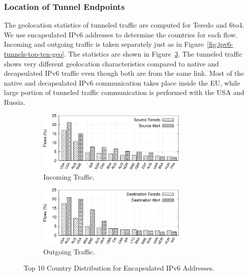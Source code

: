 \subsubsection{Location of Tunnel Endpoints}
The geolocation statistics of tunneled traffic are computed for Teredo and 6to4. We use encapsulated IPv6 addresses to determine the countries for each flow. Incoming and outgoing traffic is taken separately just as in Figure~\ref{fig:ipv6-tunnels-top-ten-geo}. The statistics are shown in Figure~\ref{fig:ipv6-tunnels-geo-tun-both}.
The tunneled traffic shows very different geolocation characteristics compared to native and decapsulated IPv6 traffic even though both are from the same link. 
Most of the native and decapsulated IPv6 communication takes place inside the EU, while large portion of tunneled traffic communication is performed with the USA and Russia. 

\begin{figure}[!tb]
    \begin{subfigure}{\textwidth}
        \centering
        \includegraphics[width=0.8\textwidth]{figures/paper-tunnels/ctry_distribution/ctry_distribution-tun-in}
        \caption{Incoming Traffic.}
        \label{fig:ipv6-tunnels-geo-tun-in}
    \end{subfigure}
    \begin{subfigure}{\textwidth}
        \centering
        \includegraphics[width=0.8\textwidth]{figures/paper-tunnels/ctry_distribution/ctry_distribution-tun-out}
        \caption{Outgoing Traffic.}
        \label{fig:ipv6-tunnels-eo-tun-out}
    \end{subfigure}
    \caption{Top 10 Country Distribution for Encapsulated IPv6 Addresses.}
    \label{fig:ipv6-tunnels-geo-tun-both}
\end{figure}

